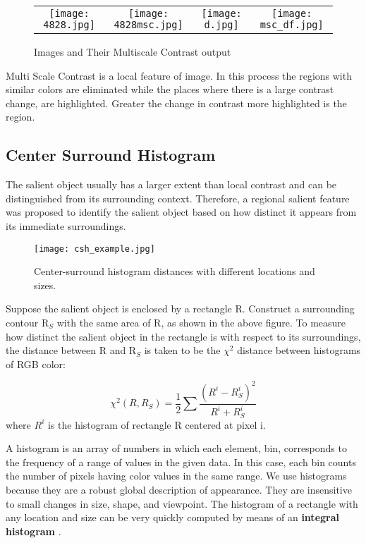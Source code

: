 \documentclass[11pt]{report}
\begin{document}
\begin{figure}[h!]
\begin{tabular}{cccc}
\texttt{[image: 4828.jpg]} 
& \texttt{[image: 4828msc.jpg]}
&
\texttt{[image: d.jpg]} & \texttt{[image: msc\_df.jpg]}
\end{tabular}
\label{tab:gt}
\caption{Images and Their Multiscale Contrast output}
\end{figure} 

Multi Scale Contrast is a local feature of image. In this process the regions with similar colors are eliminated while the places where there is a large contrast change, are highlighted. Greater the change in contrast more highlighted is the region.

\subsection*{Center Surround Histogram}
The salient object usually has a larger extent than local contrast and can be distinguished from its surrounding context. 
Therefore, a regional salient feature was proposed to identify the salient object based on how distinct it appears from its immediate surroundings. 

\begin{figure}[h!]
\center \texttt{[image: csh\_example.jpg]} 
\caption{Center-surround histogram
distances with different locations and sizes.}
\end{figure}

Suppose the salient object is enclosed by a rectangle R.
Construct a surrounding contour R$_S$ with the same area of R, as shown in the above figure. 
To measure how distinct the salient object in the rectangle is with respect to its surroundings, the distance between R and R$_S$
is taken to be the $\chi^2$ distance between histograms of RGB color: 

\begin{equation}
\chi^2(R,R_S) = \frac{1}{2} \sum \frac{(R^i -R^i_S)^2}{R^i + R^i_S}
\end{equation}
where $R^i$ is the histogram of rectangle R centered at pixel i.

A histogram is an array of numbers in which each element, bin, corresponds to the frequency of a range of values in the given data. In this case, each bin counts the number of pixels having color values in the same range.
We use histograms because they are a robust global description of appearance.
They are insensitive to small changes in size, shape, and viewpoint. 
The histogram of a rectangle with any location and size can be very quickly computed by means of an {\bf integral histogram} \cite{integralhistogram}.\\
\end{document}
